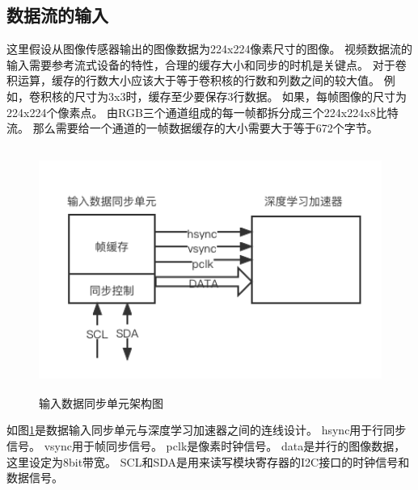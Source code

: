 \subsection{数据流的输入}

这里假设从图像传感器输出的图像数据为224x224像素尺寸的图像。
视频数据流的输入需要参考流式设备的特性，合理的缓存大小和同步的时机是关键点。
对于卷积运算，缓存的行数大小应该大于等于卷积核的行数和列数之间的较大值。
例如，卷积核的尺寸为3x3时，缓存至少要保存3行数据。
如果，每帧图像的尺寸为224x224个像素点。
由RGB三个通道组成的每一帧都拆分成三个224x224x8比特流。
那么需要给一个通道的一帧数据缓存的大小需要大于等于672个字节。

\begin{figure}[htbp]
    \centering
    \includegraphics[width=12cm,height=8cm]{figures/input_data_adapter.png}
    \caption{输入数据同步单元架构图}
    \label{fig:input_data_adapter}
\end{figure}

如图\ref{fig:input_data_adapter}是数据输入同步单元与深度学习加速器之间的连线设计。
hsync用于行同步信号。
vsync用于帧同步信号。
pclk是像素时钟信号。
data是并行的图像数据，这里设定为8bit带宽。
SCL和SDA是用来读写模块寄存器的I2C接口的时钟信号和数据信号。


